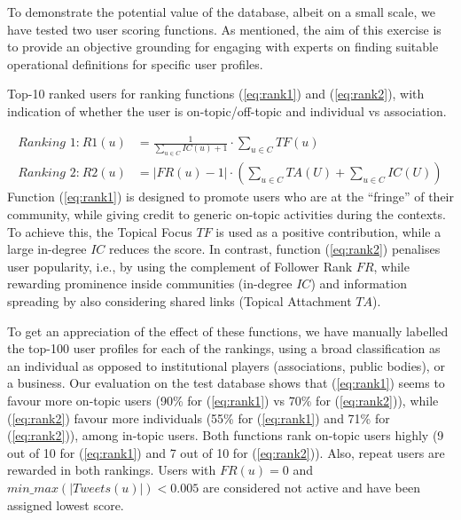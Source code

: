 To demonstrate the potential value of the database, albeit on a small scale, we have tested two user scoring functions.
As mentioned, the aim of this exercise is to provide an objective grounding for engaging with experts on finding suitable operational definitions for specific user profiles.
%
\begin{table}
	\centering
	\tiny
	\resizebox{\textwidth}{!}{
		
	}
	\caption{Top-10 ranked users for ranking functions (\ref{eq:rank1}) and (\ref{eq:rank2}), with indication of whether the user is on-topic/off-topic and individual vs association.}
	\label{tab:rank1}
\end{table}
%
\begin{align}
\textit{Ranking 1:} ~ \mathit{R1}(u) & = \frac{1}{\sum_{u \in C} \mathit{IC}(u) + 1} \cdot \sum_{u \in C} \mathit{TF}(u) \label{eq:rank1} \\
\textit{Ranking 2:} ~ \mathit{R2}(u) & = \lvert \mathit{FR}(u) - 1 \rvert \cdot \left(\sum_{u \in C} \mathit{TA}(U) + \sum_{u \in C} \mathit{IC}(U)\right) \label{eq:rank2}
\end{align}
%
Function (\ref{eq:rank1}) is designed to promote users who are at the ``fringe'' of their community, while giving credit to generic on-topic activities during the contexts. 
To achieve this, the Topical Focus $\mathit{TF}$ is used as a positive contribution, while a large in-degree $\mathit{IC}$ reduces the score.
%
In contrast, function (\ref{eq:rank2}) penalises user popularity, i.e., by using the complement of Follower Rank $\mathit{FR}$, while rewarding prominence inside communities (in-degree $\mathit{IC}$) and information spreading by also considering shared links (Topical Attachment $\mathit{TA}$).

To get an appreciation of the effect of these functions, we have manually labelled the top-100 user profiles for each of the rankings, using a broad classification as an individual as opposed to institutional players (associations, public bodies), or a business. 
Our evaluation on the test database shows that  (\ref{eq:rank1}) seems to favour more on-topic users (90\% for  (\ref{eq:rank1})  vs 70\% for  (\ref{eq:rank2})), 
while  (\ref{eq:rank2}) favour more individuals (55\% for (\ref{eq:rank1})  and 71\% for (\ref{eq:rank2})), among in-topic users.
%
Both functions rank on-topic users highly (9 out of 10 for (\ref{eq:rank1}) and 7 out of 10 for (\ref{eq:rank2})).
Also, repeat users are rewarded in both rankings. Users with $\mathit{FR}(u) = 0$ and $\mathit{min\_max(\lvert Tweets (u)\rvert) < 0.005}$ are considered not active and have been assigned lowest score.